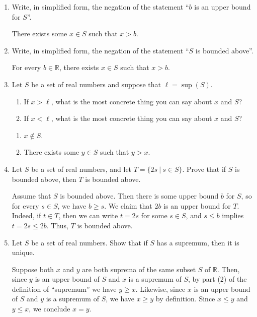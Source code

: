 \documentclass[12pt]{amsart}
\newcommand{\R}{{\mathbb{R}}}
\numberwithin{equation}{section}
\theoremstyle{plain} %
\theoremstyle{definition}
\theoremstyle{remark}
\begin{document}
\begin{enumerate}
\item Write, in simplified form, the negation of the statement ``$b$ is an upper bound for $S$''.

\begin{framed}
There exists some $x\in S$ such that $x>b$.
\end{framed}

\item Write, in simplified form, the negation of the statement ``$S$ is bounded above''.

\begin{framed}
For every $b\in \R$, there exists $x\in S$ such that $x>b$.
\end{framed}

\item Let $S$ be a set of real numbers and suppose that $\ell=\sup(S)$. 
\begin{enumerate}
\item If $x > \ell$, what is the most concrete thing you can say about $x$ and $S$?
\item If $x < \ell$, what is the most concrete thing you can say about $x$ and $S$?
\end{enumerate}


\begin{framed}
\begin{enumerate}
\item $x\notin S$.
\item There exists some $y\in S$ such that $y > x$.
\end{enumerate}
\end{framed}

\item Let $S$ be a set of real numbers, and let $T=\{ 2s \ | \ s\in S\}$. Prove that if $S$ is bounded above, then $T$ is bounded above.

\begin{framed}
Assume that $S$ is bounded above. Then there is some upper bound $b$ for $S$, so for every $s\in S$, we have $b\geq s$. We claim that $2b$ is an upper bound for $T$. Indeed, if $t\in T$, then we can write $t=2s$ for some $s\in S$, and $s\leq b$ implies $t=2s\leq 2b$. Thus, $T$ is bounded above.
\end{framed}

\item Let $S$ be a set of real numbers. Show that if $S$ has a supremum, then it is unique.
\begin{framed}
Suppose both $x$ and $y$ are both suprema 
  of the same subset $S$ of $\R$.  Then, since $y$ is an upper bound of $S$ and $x$ is a supremum of $S$, by part (2) of the definition of ``supremum''
  we have $y \geq x$. Likewise, since $x$ is an upper
bound of $S$ and $y$ is a supremum of $S$, we have 
$x \geq y$ by definition.  Since $x \leq y$ and $y \leq x$, we conclude $x = y$.  
\end{framed}


\end{enumerate}
\end{document}
